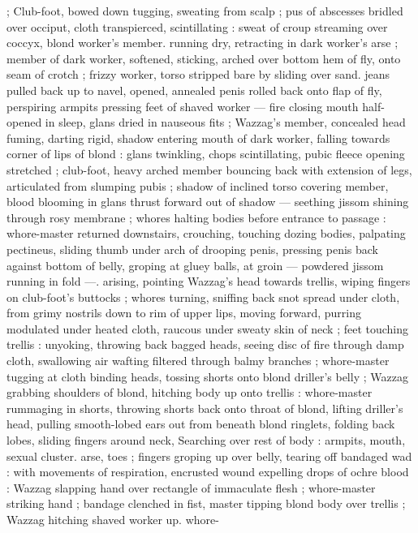 ; Club-foot, bowed down tugging, sweating from scalp ; pus of 
abscesses bridled over occiput, cloth transpierced, scintillating : 
sweat of croup streaming over coccyx, blond worker's member. 
running dry, retracting in dark worker's arse ; member of dark 
worker, softened, sticking, arched over bottom hem of fly, onto seam 
of crotch ; frizzy worker, torso stripped bare by sliding over sand. 
jeans pulled back up to navel, opened, annealed penis rolled back 
onto flap of fly, perspiring armpits pressing feet of shaved worker --- 
fire closing mouth half-opened in sleep, glans dried in nauseous fits 
; Wazzag's member, concealed head fuming, darting rigid, shadow 
entering mouth of dark worker, falling towards corner of lips of 
blond : glans twinkling, chops scintillating, pubic fleece opening 
stretched ; club-foot, heavy arched member bouncing back with 
extension of legs, articulated from slumping pubis ; shadow of 
inclined torso covering member, blood blooming in glans thrust 
forward out of shadow --- seething jissom shining through rosy 
membrane ; whores halting bodies before entrance to passage : 
whore-master returned downstairs, crouching, touching dozing 
bodies, palpating pectineus, sliding thumb under arch of drooping 
penis, pressing penis back against bottom of belly, groping at gluey 
balls, at groin --- powdered jissom running in fold ---. arising, 
pointing Wazzag's head towards trellis, wiping fingers on club-foot's 
buttocks ; whores turning, sniffing back snot spread under cloth, 
from grimy nostrils down to rim of upper lips, moving forward, 
purring modulated under heated cloth, raucous under sweaty skin of 
neck ; feet touching trellis : unyoking, throwing back bagged heads, 
seeing disc of fire through damp cloth, swallowing air wafting filtered 
through balmy branches ; whore-master tugging at cloth binding 
heads, tossing shorts onto blond driller's belly ; Wazzag grabbing 
shoulders of blond, hitching body up onto trellis : whore-master 
rummaging in shorts, throwing shorts back onto throat of blond, 
lifting driller's head, pulling smooth-lobed ears out from beneath 
blond ringlets, folding back lobes, sliding fingers around neck, 
Searching over rest of body : armpits, mouth, sexual cluster. arse, 
toes ; fingers groping up over belly, tearing off bandaged wad : with 
movements of respiration, encrusted wound expelling drops of ochre 
blood : Wazzag slapping hand over rectangle of immaculate flesh ; 
whore-master striking hand ; bandage clenched in fist, master tipping 
blond body over trellis ; Wazzag hitching shaved worker up. whore- 
